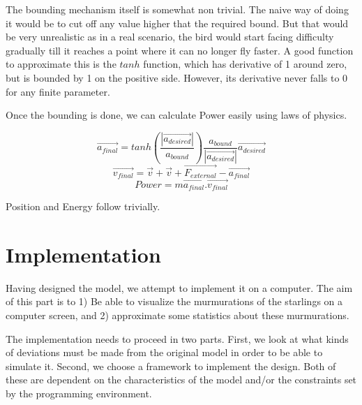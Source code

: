 \documentclass{article}
\begin{document}
The bounding mechanism itself is somewhat non trivial. The naive way of doing it would be to cut off any value higher that the required bound. But that would be very unrealistic as in a real scenario, the bird would start facing difficulty gradually till it reaches a point where it can no longer fly faster. 
A good function to approximate this is the $tanh$ function, which has derivative of 1 around zero, but is bounded by 1 on the positive side. However, its derivative never falls to 0 for any finite parameter.

Once the bounding is done, we can calculate Power easily using laws of physics.
\begin{center}
    $$\vec{a_{final}}=tanh(\frac{|\vec{a_{desired}}|}{a_{bound}})\frac{a_{bound}}{|\vec{a_{desired}}|}\vec{a_{desired}}$$
    $$\vec{v_{final}}=\vec{v}+\vec{v}+\vec{F_{external}}-\vec{a_{final}}$$
    $$Power=m\vec{a_{final}}.\vec{v_{final}}$$
\end{center}
Position and Energy follow trivially.


\pagebreak
\section{Implementation}
Having designed the model, we attempt to implement it on a computer. The aim of this part is to 1) Be able to visualize the murmurations of the starlings on a computer screen, and 2) approximate some statistics about these murmurations.

The implementation needs to proceed in two parts. First, we look at what kinds of deviations must be made from the original model in order to be able to simulate it. Second, we choose a framework to implement the design. Both of these are dependent on the characteristics of the model and/or the constraints set by the programming environment.
\end{document}
